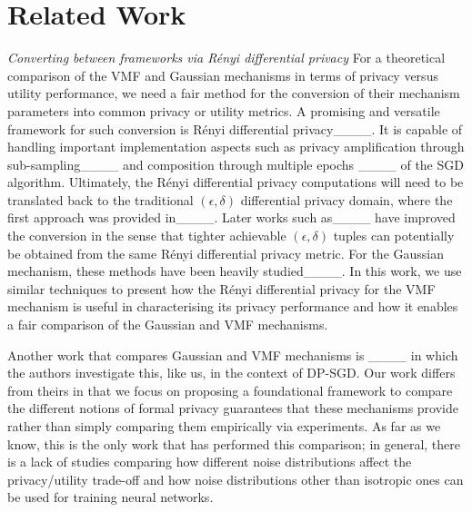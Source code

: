\section{Related Work}
\label{sec:lit-rev}


    

    

\emph{Converting between frameworks via R\'enyi differential privacy}
For a theoretical comparison of the VMF and Gaussian mechanisms in terms of privacy versus utility performance, we need a fair method for the conversion of their mechanism parameters into common privacy or utility metrics. 
A promising and versatile framework for such conversion is  R\'enyi differential privacy____. It is capable of handling important implementation aspects such as privacy amplification through sub-sampling____ and composition through multiple epochs ____ of the SGD algorithm. Ultimately, the R\'enyi differential privacy computations will need to be translated back to the traditional $(\epsilon,\delta)$ differential privacy domain, where the first approach was provided in____. Later works such as____ have improved the conversion in the sense that tighter achievable $(\epsilon,\delta)$ tuples can potentially be obtained from the same R\'enyi differential privacy metric. For the Gaussian mechanism, these methods have been heavily studied____. In this work, we use similar techniques to present how the R\'enyi differential privacy for the VMF mechanism is useful in characterising its privacy performance and how it enables a fair comparison of the Gaussian and VMF mechanisms. 

Another work that compares Gaussian and VMF mechanisms is ____ in which the authors investigate this, like us, in the context of DP-SGD. Our work differs from theirs in that we focus on proposing a foundational framework to compare the different notions of formal privacy guarantees that these mechanisms provide rather than simply comparing them empirically via experiments. 
As far as we know, this is the only work that has performed this comparison; in general, there is a lack of studies comparing how different noise distributions affect the privacy/utility trade-off and how noise distributions other than isotropic ones can be used for training neural networks. 

